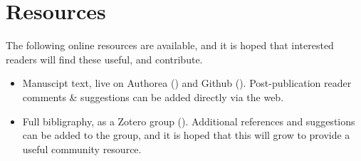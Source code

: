 \section{Resources}

The following online resources are available, and it is hoped that interested readers will find these useful, and contribute.

\begin{itemize}
\item Manuscipt text, live on Authorea () and Github (). Post-publication reader comments \& suggestions can be added directly via the web.
\item Full bibligraphy, as a Zotero group (). Additional references and suggestions can be added to the group, and it is hoped that this will grow to provide a useful community resource.
\end{itemize}